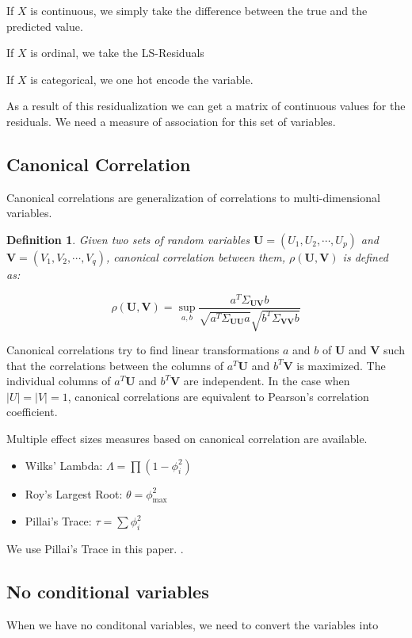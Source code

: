 \documentclass[letterpaper]{article} %
\newtheorem{definition}{Definition}
\begin{document}
If $ X $ is continuous, we simply take the difference between the true and the 
predicted value.

If $ X $ is ordinal, we take the LS-Residuals

If $ X $ is categorical, we one hot encode the variable.


As a result of this residualization we can get a matrix of continuous values for 
the residuals. We need a measure of association for this set of variables.

\subsection{Canonical Correlation}
Canonical correlations are generalization of correlations to multi-dimensional variables.

\begin{definition}
	Given two sets of random variables $ \bm{U} = (U_1, U_2, \cdots, U_p) $
	and $ \bm{V} = (V_1, V_2, \cdots, V_q) $, canonical correlation between
	them, $\rho(\bm{U}, \bm{V}) $ is defined as:
		
	\begin{equation}
		\rho(\bm{U}, \bm{V}) = \sup_{a, b} \frac{a^T \Sigma_{\bm{U}\bm{V}} b}{\sqrt{a^T \Sigma_{\bm{U}\bm{U}} a} \sqrt{b^T \Sigma_{\bm{V}\bm{V}} b}}
	\end{equation}

\end{definition}
	
	Canonical correlations try to find linear transformations $ a $ and $ b
	$ of $ \bm{U} $ and $ \bm{V} $ such that the correlations between the
	columns of $ a^T \bm{U} $ and $ b^T \bm{V} $ is maximized. The
	individual columns of $ a^T \bm{U} $ and $ b^T \bm{V} $ are
	independent. In the case when $ \rvert U \rvert = \rvert V \rvert = 1$,
	canonical correlations are equivalent to Pearson's correlation
	coefficient.

Multiple effect sizes measures based on canonical correlation are available.
\begin{itemize}
	\item Wilks' Lambda: $ \Lambda = \prod (1 - \phi_i^2) $
	\item Roy's Largest Root: $ \theta = \phi_{\max}^2 $
	\item Pillai's Trace: $ \tau = \sum \phi_i^2 $
\end{itemize}
We use Pillai's Trace in this paper. .

\subsection{No conditional variables}
When we have no conditonal variables, we need to convert the variables into 
\end{document}

